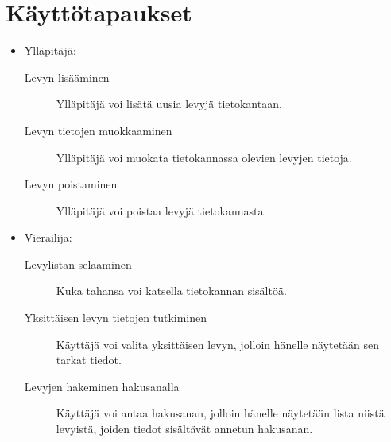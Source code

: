 \documentclass[a4paper,12pt]{report}
\begin{document}
\section{Käyttötapaukset}

\begin{itemize}

\item Ylläpitäjä:
\begin{description}
\item[Levyn lisääminen] Ylläpitäjä voi lisätä uusia levyjä tietokantaan.
\item[Levyn tietojen muokkaaminen] Ylläpitäjä voi muokata tietokannassa olevien levyjen tietoja.
\item[Levyn poistaminen] Ylläpitäjä voi poistaa levyjä tietokannasta.
\end{description}

\item Vierailija:
\begin{description}
\item[Levylistan selaaminen] Kuka tahansa voi katsella tietokannan sisältöä.
\item[Yksittäisen levyn tietojen tutkiminen] Käyttäjä voi valita yksittäisen levyn, jolloin hänelle näytetään sen tarkat tiedot.
\item[Levyjen hakeminen hakusanalla] Käyttäjä voi antaa hakusanan, jolloin hänelle näytetään lista niistä levyistä, joiden tiedot sisältävät annetun hakusanan.
\end{description}

\end{itemize}
\end{document}
